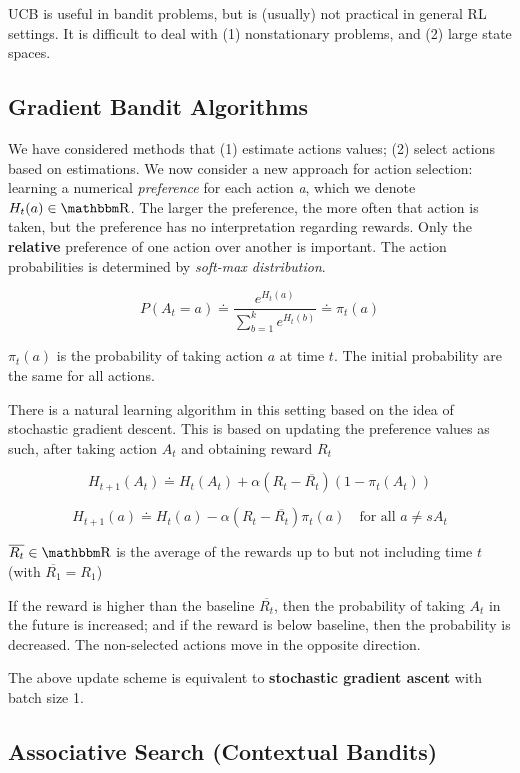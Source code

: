 \documentclass[sutton_barto_notes.tex]{subfiles}
\begin{document}
UCB is useful in bandit problems, but is (usually) not practical in general RL settings. It is difficult to deal with (1) nonstationary problems, and (2) large state spaces.

\subsection{Gradient Bandit Algorithms}
We have considered methods that (1) estimate actions values; (2) select actions based on estimations.
We now consider a new approach for action selection: learning a numerical \textit{preference} for each action \textit{a}, which we denote $H_t(a) \in \R$.
The larger the preference, the more often that action is taken, but the preference has no interpretation regarding rewards.
Only the \textbf{relative} preference of one action over another is important.
The action probabilities is determined by \textit{soft-max distribution}.

\[
P(A_t=a) \doteq \frac{e^{H_t(a)}}{\sum_{b=1}^k e^{H_t(b)}} \doteq \pi_t(a)
\]

$\pi_t(a)$ is the probability of taking action $a$ at time $t$. The initial probability are the same for all actions.

There is a natural learning algorithm in this setting based on the idea of stochastic gradient descent.
This is based on updating the preference values as such, after taking action $A_t$ and obtaining reward $R_t$

$$ H_{t+1}(A_t)\doteq H_t(A_t) + \alpha (R_t - \overline{R_t})(1-\pi_t(A_t)) $$

$$ H_{t+1}(a) \doteq H_t(a) - \alpha(R_t - \overline{R_t})\pi_t(a)\quad\text{for all }a\neq sA_t $$

$\overline{R_t} \in \R $ is the average of the rewards up to but not including time $t$ (with $\overline{R_1} = R_1$)

If the reward is higher than the baseline $\overline{R_t}$, then the probability of taking $A_t$ in the future is increased; and if the reward is below baseline, then the probability is decreased.
The non-selected actions move in the opposite direction.

The above update scheme is equivalent to \textbf{stochastic gradient ascent} with batch size 1.

\subsection{Associative Search (Contextual Bandits)}
\end{document}
